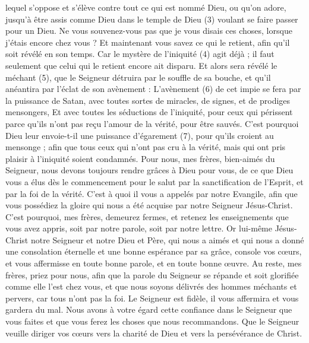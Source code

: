 \begin{multicols}{2}
lequel s'oppose et s'élève contre tout ce qui est nommé Dieu, ou qu'on adore, jusqu'à être assis comme Dieu dans le temple de Dieu (3) voulant se faire passer pour un Dieu.
Ne vous souvenez-vous pas que je vous disais ces choses, lorsque j’étais encore chez vous ?
Et maintenant vous savez ce qui le retient, afin qu'il soit révélé en son temps.
Car le mystère de l'iniquité (4) agit déjà ; il faut seulement que celui qui le retient encore ait disparu.
Et alors sera révélé le méchant (5), que le Seigneur détruira par le souffle de sa bouche, et qu’il anéantira par l’éclat de son avènement :
L'avènement (6) de cet impie se fera par la puissance de Satan, avec toutes sortes de miracles, de signes, et de prodiges mensongers,
Et avec toutes les séductions de l’iniquité, pour ceux qui périssent parce qu'ils n'ont pas reçu l'amour de la vérité, pour être sauvés.
C'est pourquoi Dieu leur envoie-t-il une puissance d’égarement (7), pour qu’ils croient au mensonge ;
afin que tous ceux qui n’ont pas cru à la vérité, mais qui ont pris plaisir à l’iniquité soient condamnés.
Pour nous, mes frères, bien-aimés du Seigneur, nous devons toujours rendre grâces à Dieu pour vous, de ce que Dieu vous a élus dès le commencement pour le salut par la sanctification de l'Esprit, et par la foi de la vérité.
C’est à quoi il vous a appelés par notre Evangile, afin que vous possédiez la gloire qui nous a été acquise par notre Seigneur Jésus-Christ.
C'est pourquoi, mes frères, demeurez fermes, et retenez les enseignements que vous avez appris, soit par notre parole, soit par notre lettre.
Or lui-même Jésus-Christ notre Seigneur et notre Dieu et Père, qui nous a aimés et qui nous a donné une consolation éternelle et une bonne espérance par sa grâce,
console vos cœurs, et vous affermisse en toute bonne parole, et en toute bonne œuvre.
\VerseOne{}Au reste, mes frères, priez pour nous, afin que la parole du Seigneur se répande et soit glorifiée comme elle l'est chez vous,
et que nous soyons délivrés des hommes méchants et pervers, car tous n’ont pas la foi.
Le Seigneur est fidèle, il vous affermira et vous gardera du mal.
Nous avons à votre égard cette confiance dans le Seigneur que vous faites et que vous ferez les choses que nous recommandons.
Que le Seigneur veuille diriger vos cœurs vers la charité de Dieu et vers la persévérance de Christ.

\end{multicols}
